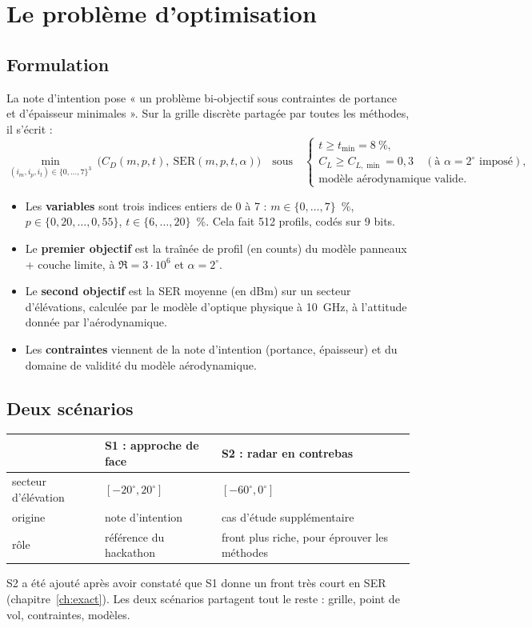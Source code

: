 \chapter{Le problème d'optimisation}\label{ch:probleme}

\section{Formulation}
La note d'intention pose « un problème bi-objectif sous contraintes de portance et d'épaisseur minimales ». Sur la grille discrète partagée par toutes les méthodes, il s'écrit :
\[
\min_{(i_m,i_p,i_t)\in\{0,\dots,7\}^3}\ \Big(C_D(m,p,t),\ \mathrm{SER}(m,p,t,\alpha)\Big)
\quad\text{sous}\quad
\begin{cases}
t\ge t_{\min}=8~\%,\\
C_L\ge C_{L,\min}=0{,}3\quad(\text{à }\alpha=2^\circ\text{ imposé}),\\
\text{modèle aérodynamique valide}.
\end{cases}
\]
\begin{itemize}
\item Les \textbf{variables} sont trois indices entiers de 0 à 7 : $m\in\{0,\dots,7\}$~\%, $p\in\{0{,}20,\dots,0{,}55\}$, $t\in\{6,\dots,20\}$~\%. Cela fait 512 profils, codés sur 9 bits.
\item Le \textbf{premier objectif} est la traînée de profil (en counts) du modèle panneaux + couche limite, à $\Re=3\cdot10^6$ et $\alpha=2^\circ$.
\item Le \textbf{second objectif} est la SER moyenne (en dBm) sur un secteur d'élévations, calculée par le modèle d'optique physique à 10~GHz, à l'attitude donnée par l'aérodynamique.
\item Les \textbf{contraintes} viennent de la note d'intention (portance, épaisseur) et du domaine de validité du modèle aérodynamique.
\end{itemize}

\section{Deux scénarios}
\begin{center}
\begin{tabular}{lll}
\toprule
 & S1 : approche de face & S2 : radar en contrebas \\
\midrule
secteur d'élévation & $[-20^\circ,20^\circ]$ & $[-60^\circ,0^\circ]$ \\
origine & note d'intention & cas d'étude supplémentaire \\
rôle & référence du hackathon & front plus riche, pour éprouver les méthodes \\
\bottomrule
\end{tabular}
\end{center}
S2 a été ajouté après avoir constaté que S1 donne un front très court en SER (chapitre~\ref{ch:exact}). Les deux scénarios partagent tout le reste : grille, point de vol, contraintes, modèles.

